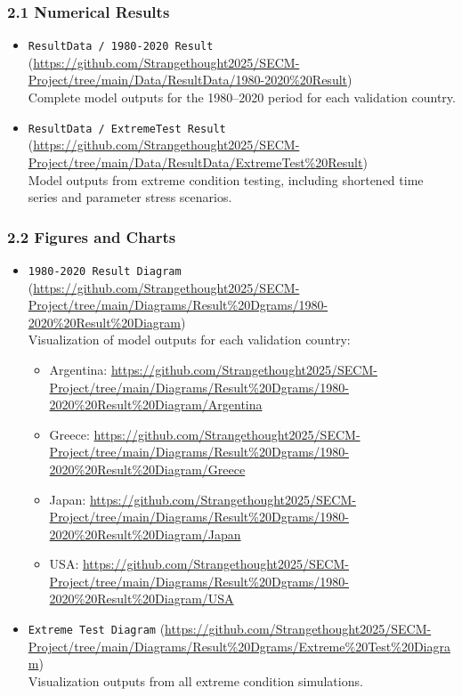 \documentclass[12pt,a4paper]{article}
\begin{document}
\subsubsection*{2.1 Numerical Results}
\begin{itemize}
    \item \texttt{ResultData / 1980-2020 Result} (\url{https://github.com/Strangethought2025/SECM-Project/tree/main/Data/ResultData/1980-2020\%20Result})\\
    Complete model outputs for the 1980–2020 period for each validation country.
    \item \texttt{ResultData / ExtremeTest Result} (\url{https://github.com/Strangethought2025/SECM-Project/tree/main/Data/ResultData/ExtremeTest\%20Result})\\
    Model outputs from extreme condition testing, including shortened time series and parameter stress scenarios.
\end{itemize}

\subsubsection*{2.2 Figures and Charts}
\begin{itemize}
    \item \texttt{1980-2020 Result Diagram} (\url{https://github.com/Strangethought2025/SECM-Project/tree/main/Diagrams/Result\%20Dgrams/1980-2020\%20Result\%20Diagram})\\
    Visualization of model outputs for each validation country:
    \begin{itemize}
        \item Argentina: \url{https://github.com/Strangethought2025/SECM-Project/tree/main/Diagrams/Result\%20Dgrams/1980-2020\%20Result\%20Diagram/Argentina}
        \item Greece: \url{https://github.com/Strangethought2025/SECM-Project/tree/main/Diagrams/Result\%20Dgrams/1980-2020\%20Result\%20Diagram/Greece}
        \item Japan: \url{https://github.com/Strangethought2025/SECM-Project/tree/main/Diagrams/Result\%20Dgrams/1980-2020\%20Result\%20Diagram/Japan}
        \item USA: \url{https://github.com/Strangethought2025/SECM-Project/tree/main/Diagrams/Result\%20Dgrams/1980-2020\%20Result\%20Diagram/USA}
    \end{itemize}
    \item \texttt{Extreme Test Diagram} (\url{https://github.com/Strangethought2025/SECM-Project/tree/main/Diagrams/Result\%20Dgrams/Extreme\%20Test\%20Diagram})\\
    Visualization outputs from all extreme condition simulations.
\end{itemize}
\end{document}
